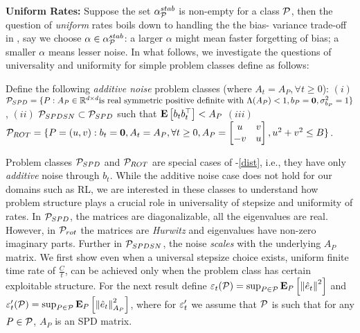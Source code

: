 \textbf{Uniform Rates:} Suppose the set $\alpha^{stab}_{\P}$ is non-empty for a class $\P$, then the question of \emph{uniform} rates boils down to handling the the bias-
variance trade-off in , say we choose $\alpha\in\alpha^{stab}_{\P}$: a larger $\alpha$ might mean faster forgetting of bias; a smaller $\alpha$ means lesser noise. In what follows, we investigate the questions of universality and uniformity for simple problem classes define as follows:
\begin{definition}
Define the following \emph{additive noise} problem classes (where $A_t=A_P,\forall t\geq 0$): $(i)$  $\P_{SPD}=\{ P: A_P\in \R^{\dcd}\text{is real symmetric positive definite with~} \Lambda(A_P)<1, b_P=\mathbf{0}, \sigma^2_{b_P}=1\}$, $(ii)$ $\P_{SPDSN}\subset \P_{SPD}$ such that $\EE{b_tb_t^\top}<A_P$ $(iii)$ $\P_{ROT}=\{P=(u,v): b_t=\mathbf{0}, A_t=A_P, \forall t\geq 0, A_P=\left[\begin{matrix} u &v \\ -v & u\end{matrix}\right], u^2+v^2\leq B\}$.
\end{definition}
Problem classes $\P_{SPD}$ and $\P_{ROT}$ are special cases of -\eqref{dist}, i.e., they have only \emph{additive} noise through $b_t$. While the additive noise case does not hold for our domains such as RL, we are interested in these classes to understand how problem structure plays a crucial role in universality of stepsize and uniformity of rates. In $\P_{SPD}$, the matrices are diagonalizable, all the eigenvalues are real. However, in $\P_{rot}$ the matrices are \emph{Hurwitz} and eigenvalues have non-zero imaginary parts. Further in $\P_{SPDSN}$, the noise \emph{scales} with the underlying $A_P$ matrix. 
We first show even when a universal stepsize choice exists, uniform finite time rate of $\frac{C}{t}$, can be achieved only when the problem class has certain exploitable structure.
\fi
For the next result define
$\eps_t(\cP) = \sup_{P\in \cP} \eep{\norm{\eh_t}^2}{P}$ and
$\eps_t'(\cP) = \sup_{P\in \cP}\eep{\norm{\eh_t}^2_{A_P}}{P}$, where for $\eps_t'$ we assume that $\cP$ is such that for any $P\in \cP$, $A_P$ is an SPD matrix.
